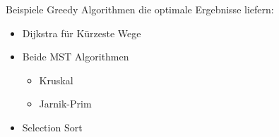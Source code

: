 \begin{frame}{Beispiele}
	\large{Greedy Algorithmen die optimale Ergebnisse liefern:}
	\begin{itemize}
		\item Dijkstra für Kürzeste Wege
		\item Beide MST Algorithmen
		\begin{itemize}
			\item Kruskal
			\item Jarnik-Prim
		\end{itemize}
		\item Selection Sort
	\end{itemize}

\end{frame}







